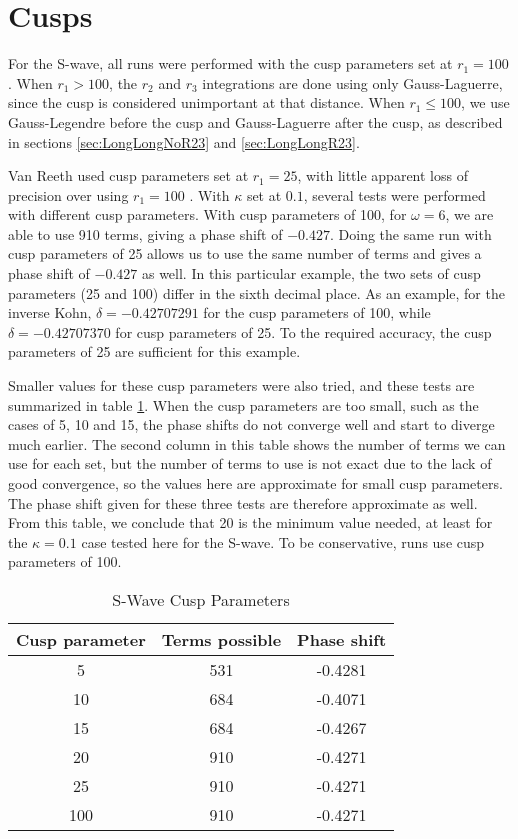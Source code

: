 \documentclass[Dissertation.tex]{subfiles}
\begin{document}
\section{Cusps}

For the S-wave, all runs were performed with the cusp parameters set at $r_1 = 100$. When $r_1 > 100$, the $r_2$ and $r_3$ integrations are done using only Gauss-Laguerre, since the cusp is considered unimportant at that distance. When $r_1 \leq 100$, we use Gauss-Legendre before the cusp and Gauss-Laguerre after the cusp, as described in sections \ref{sec:LongLongNoR23} and \ref{sec:LongLongR23}. 

Van Reeth used cusp parameters set at $r_1 = 25$, with little apparent loss of precision over using $r_1 = 100$ \cite{}. With $\kappa$ set at $0.1$, several tests were performed with different cusp parameters. With cusp parameters of 100, for $\omega = 6$, we are able to use 910 terms, giving a phase shift of $-0.427$. Doing the same run with cusp parameters of 25 allows us to use the same number of terms and gives a phase shift of $-0.427$ as well. In this particular example, the two sets of cusp parameters (25 and 100) differ in the sixth decimal place. As an example, for the inverse Kohn, $\delta = -0.42707291$ for the cusp parameters of 100, while $\delta = -0.42707370$ for cusp parameters of 25. To the required accuracy, the cusp parameters of 25 are sufficient for this example.

Smaller values for these cusp parameters were also tried, and these tests are summarized in table \ref{tab:SWaveCuspParameters}. When the cusp parameters are too small, such as the cases of 5, 10 and 15, the phase shifts do not converge well and start to diverge much earlier. The second column in this table shows the number of terms we can use for each set, but the number of terms to use is not exact due to the lack of good convergence, so the values here are approximate for small cusp parameters. The phase shift given for these three tests are therefore approximate as well. From this table, we conclude that 20 is the minimum value needed, at least for the $\kappa = 0.1$ case tested here for the S-wave. To be conservative, runs use cusp parameters of 100. 


\begin{table}[H]
\centering
\begin{tabular}{c c c}
\toprule
Cusp parameter & Terms possible & Phase shift \\
\midrule
 5 & 531 & -0.4281 \\
10 & 684 & -0.4071 \\
15 & 684 & -0.4267 \\
20 & 910 & -0.4271 \\
25 & 910 & -0.4271 \\
100 & 910 & -0.4271 \\
\bottomrule
\end{tabular}
\caption{S-Wave Cusp Parameters}
\label{tab:SWaveCuspParameters}
\end{table}
\end{document}

